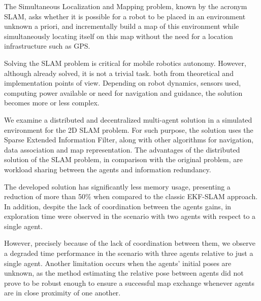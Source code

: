 The Simultaneous Localization and Mapping problem, known by the acronym SLAM, asks whether it is possible for a robot to be placed in an environment
unknown a priori, and incrementally build a map of this
environment while simultaneously locating itself on this map without the
need for a location infrastructure such as GPS.

Solving the SLAM problem is critical for mobile robotics
autonomy. However, although already solved, it is not a trivial task.
both from theoretical and implementation points of view.
Depending on robot dynamics, sensors used, computing power available or need for navigation and guidance, the solution
becomes more or less complex.

We examine a distributed and decentralized multi-agent solution in a simulated environment
for the 2D SLAM problem. For such purpose, the solution uses the Sparse Extended Information Filter, along with other algorithms for navigation,
data association and map representation. The advantages of the distributed solution of the
SLAM problem, in comparison with the original problem, are workload sharing
between the agents and information redundancy.

The developed solution has significantly less memory usage,
presenting a reduction of more than 50\% when compared to the classic EKF-SLAM approach.
In addition, despite the lack of coordination between the agents
gains, in exploration time were observed in the scenario with two agents with respect to a single agent.

However, precisely because of the lack of
coordination between them, we observe a degraded time performance in the scenario with
three agents relative to just a single agent. Another limitation occurs
when the agents' initial poses are unknown, as the method estimating the relative pose between agents did not prove to be robust
enough to ensure a successful map exchange whenever agents are in close 
proximity of one another.
